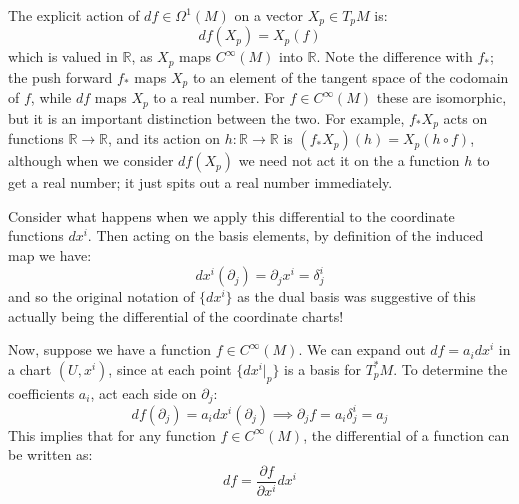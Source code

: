 The explicit action of $df\in\Omega^1(M)$ on a vector $X_p\in T_pM$ is:
\begin{equation}
	df(X_p) = X_p(f)
\end{equation}
which is valued in $\mathbb R$, as $X_p$ maps $C^\infty(M)$ into $\mathbb R$. Note the difference with $f_*$; the 
push forward $f_*$ maps $X_p$ to an element of the tangent space of the codomain of $f$, while $df$ maps $X_p$ to 
a real number. For $f\in C^\infty(M)$ these are isomorphic, but it is an important distinction between the two. For example, 
$f_* X_p$ acts on functions $\mathbb R\rightarrow\mathbb R$, and its action on $h : \mathbb R\rightarrow\mathbb R$ is 
$(f_* X_p)(h) = X_p(h\circ f)$, although when we consider $df (X_p)$ we need not act it on the a function $h$ to get a 
real number; it just spits out a real number immediately.


Consider what happens when we apply this differential to the coordinate 
functions $dx^i$. Then acting on the basis elements, by definition of the induced map we have:
\begin{equation}
	dx^i(\partial_j) = \partial_j x^i = \delta^i_j
\end{equation}
and so the original notation of $\{dx^i\}$ as the dual basis was suggestive of this actually being the differential 
of the coordinate charts! 

Now, suppose we have a function $f\in C^\infty(M)$. We can expand out $df = a_i dx^i$ in a chart $(U, x^i)$, since at 
each point $\{dx^i|_p\}$ is a basis for $T_p^* M$. To determine the coefficients $a_i$, act each side on $\partial_j$:
\begin{equation}
	df(\partial_j) = a_i dx^i(\partial_j)\implies \partial_j f = a_i\delta^i_j = a_j
\end{equation}
This implies that for any function $f\in C^\infty(M)$, the differential of a function can be written as:
\begin{equation}
	df = \frac{\partial f}{\partial x^i}dx^i
\end{equation}

